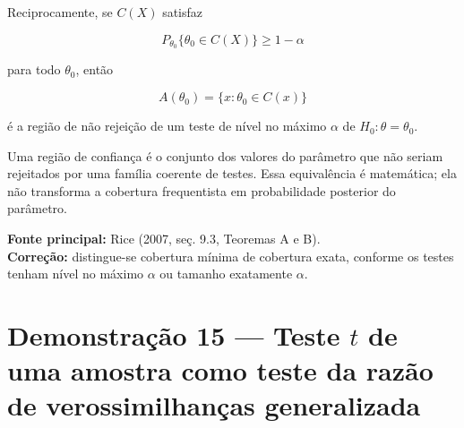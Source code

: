 \documentclass[
  letterpaper,
  DIV=11,
  numbers=noendperiod]{scrreprt}
\begin{document}
Reciprocamente, se \(C(X)\) satisfaz

\[
P_{\theta_0}\{\theta_0\in C(X)\}\geq1-\alpha
\]

para todo \(\theta_0\), então

\[
A(\theta_0)=\{x:\theta_0\in C(x)\}
\]

é a região de não rejeição de um teste de nível no máximo \(\alpha\) de
\(H_0:\theta=\theta_0\).

\begin{tcolorbox}[enhanced jigsaw, colback=white, leftrule=.75mm, colbacktitle=quarto-callout-tip-color!10!white, breakable, titlerule=0mm, bottomtitle=1mm, title=\textcolor{quarto-callout-tip-color}{\faLightbulb}\hspace{0.5em}{Interpretação}, colframe=quarto-callout-tip-color-frame, toprule=.15mm, opacityback=0, bottomrule=.15mm, opacitybacktitle=0.6, arc=.35mm, toptitle=1mm, rightrule=.15mm, coltitle=black, left=2mm]

Uma região de confiança é o conjunto dos valores do parâmetro que não
seriam rejeitados por uma família coerente de testes. Essa equivalência
é matemática; ela não transforma a cobertura frequentista em
probabilidade posterior do parâmetro.

\end{tcolorbox}

\begin{tcolorbox}[enhanced jigsaw, colback=white, leftrule=.75mm, colbacktitle=quarto-callout-note-color!10!white, breakable, titlerule=0mm, bottomtitle=1mm, title=\textcolor{quarto-callout-note-color}{\faInfo}\hspace{0.5em}{Fonte da demonstração}, colframe=quarto-callout-note-color-frame, toprule=.15mm, opacityback=0, bottomrule=.15mm, opacitybacktitle=0.6, arc=.35mm, toptitle=1mm, rightrule=.15mm, coltitle=black, left=2mm]

\textbf{Fonte principal:} Rice (2007, seç. 9.3, Teoremas A e B).\\
\textbf{Correção:} distingue-se cobertura mínima de cobertura exata,
conforme os testes tenham nível no máximo \(\alpha\) ou tamanho
exatamente \(\alpha\).

\end{tcolorbox}

\section*{\texorpdfstring{Demonstração 15 --- Teste \(t\) de uma amostra
como teste da razão de verossimilhanças
generalizada}{Demonstração 15 --- Teste t de uma amostra como teste da razão de verossimilhanças generalizada}}\label{demonstrauxe7uxe3o-15-teste-t-de-uma-amostra-como-teste-da-razuxe3o-de-verossimilhanuxe7as-generalizada}
\end{document}
